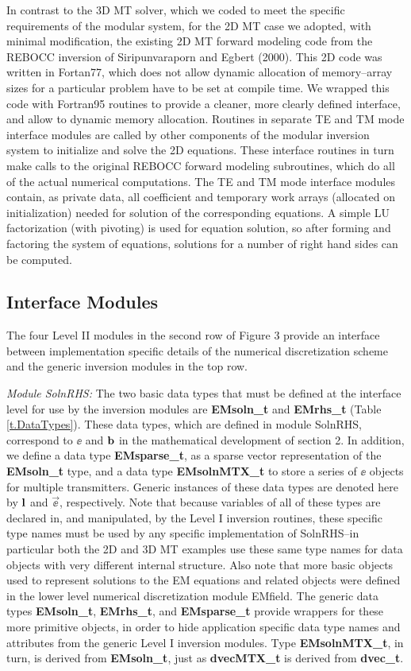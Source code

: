 In contrast to the 3D MT solver, which we coded to meet the specific
requirements of the modular system, for the 2D MT case we
adopted, with minimal modification, the existing 2D MT forward modeling 
code from the REBOCC inversion
of Siripunvaraporn and Egbert (2000).
This 2D code was written in Fortan77, which does not
allow dynamic allocation of memory--array sizes for a particular
problem have to be set at compile time.
We wrapped this code with Fortran95
routines to provide a cleaner, more clearly defined interface,
and allow to dynamic memory allocation.
Routines in separate TE and TM mode interface modules
are called by other components of the modular inversion
system to initialize and solve the 2D equations.
These interface routines in turn make calls to the
original REBOCC forward modeling subroutines,
which do all of the actual numerical computations.
The TE and TM mode interface modules contain,
as private data, all coefficient and temporary work arrays
(allocated on initialization)
needed for solution of the corresponding equations.
A simple LU factorization (with pivoting) is used for equation solution,
so after forming and factoring the system of equations,
solutions for a number of right hand sides can be computed.

\subsection{Interface Modules}

The four Level II modules in the second row of Figure 3 provide an
interface between implementation specific details
of the numerical discretization scheme
and the generic inversion modules in the top row.

\vspace{6pt}
\noindent
{\em Module SolnRHS:}  The two basic data types that must be defined 
at the interface level for use by the inversion
modules are {\bf EMsoln\_t} and {\bf EMrhs\_t} (Table \ref{t.DataTypes}).
These data types, which are defined in module SolnRHS, correspond
to $\ee$ and ${\bf b}$ in the mathematical development of section 2.
In addition, we define a data type {\bf EMsparse\_t}, as a sparse vector
representation of the {\bf EMsoln\_t} type,
and a data type {\bf EMsolnMTX\_t} to store a series of $\ee$
objects for multiple transmitters.  Generic instances of these
data types are denoted here by $\bf l$ and $\vec\ee$, respectively.  
Note that because variables of all of these types are declared in,
and manipulated, by the Level I inversion routines, these specific
type names must be used by any specific implementation of SolnRHS--in
particular both the 2D and 3D MT examples
use these same type names for data objects with very different
internal structure.
Also note that more basic objects used to represent
solutions to the EM equations and related objects
were defined in the lower level numerical discretization module EMfield.
The generic data types {\bf EMsoln\_t}, {\bf EMrhs\_t}, 
and {\bf EMsparse\_t} provide wrappers for these
more primitive objects, in order to hide application specific data
type names and attributes from the generic Level I inversion modules.  
Type {\bf EMsolnMTX\_t}, in turn, is derived from {\bf EMsoln\_t},
just as {\bf dvecMTX\_t} is derived from {\bf dvec\_t}.

